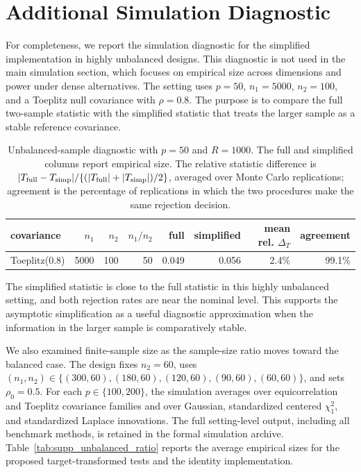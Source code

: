 \documentclass[
  12pt]{article}
\theoremstyle{plain}
\theoremstyle{definition}
\theoremstyle{remark}
\begin{document}
\section{Additional Simulation Diagnostic}
\label{sec:supp_additional_simulation}

For completeness, we report the simulation diagnostic for the simplified
implementation in highly unbalanced designs.  This diagnostic is not used in
the main simulation section, which focuses on empirical size across dimensions
and power under dense alternatives.  The setting uses \(p=50\),
\(n_1=5000\), \(n_2=100\), and a Toeplitz null covariance with \(\rho=0.8\).
The purpose is to compare the full two-sample statistic with the simplified
statistic that treats the larger sample as a stable reference covariance.

\begin{table}[!htbp]
\centering
\footnotesize
\caption{Unbalanced-sample diagnostic with \(p=50\) and \(R=1000\).  The full and simplified columns report empirical size.  The relative statistic difference is \(|T_{\rm full}-T_{\rm simp}|/\{(|T_{\rm full}|+|T_{\rm simp}|)/2\}\), averaged over Monte Carlo replications; agreement is the percentage of replications in which the two procedures make the same rejection decision.}
\label{tab:supp_unbalanced_restart}
\begin{tabular}{lrrrrrrr}
\toprule
covariance & \(n_1\) & \(n_2\) & \(n_1/n_2\) & full & simplified & mean rel. \(\Delta_T\) & agreement \\
\midrule
Toeplitz(0.8) & 5000 & 100 & 50 & 0.049 & 0.056 & 2.4\% & 99.1\% \\
\bottomrule
\end{tabular}
\end{table}

The simplified statistic is close to the full statistic in this highly
unbalanced setting, and both rejection rates are near the nominal level.  This
supports the asymptotic simplification as a useful diagnostic approximation
when the information in the larger sample is comparatively stable.

We also examined finite-sample size as the sample-size ratio moves toward the
balanced case.  The design fixes \(n_2=60\), uses
\((n_1,n_2)\in\{(300,60),(180,60),(120,60),(90,60),(60,60)\}\), and sets
\(\rho_0=0.5\).  For each \(p\in\{100,200\}\), the simulation averages over
equicorrelation and Toeplitz covariance families and over Gaussian,
standardized centered \(\chi^2_1\), and standardized Laplace innovations.  The
full setting-level output, including all benchmark methods, is retained in the
formal simulation archive.  Table~\ref{tab:supp_unbalanced_ratio} reports the
average empirical sizes for the proposed target-transformed tests and the
identity implementation.
\end{document}
